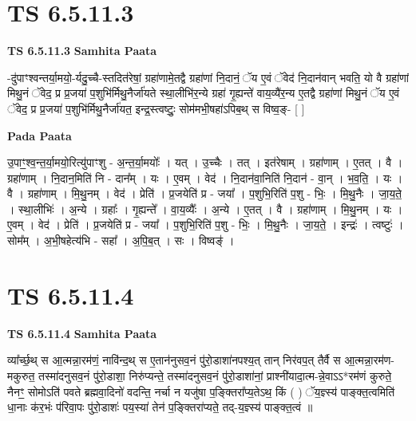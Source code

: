 \documentclass[17pt]{extarticle}
\begin{document}
\section*{ TS 6.5.11.3 }

\textbf{TS 6.5.11.3 } \newline
\textbf{Samhita Paata} \newline

-दु॑पाꣳश्वन्तर्या॒मयो॒-र्यदु॒च्चै-स्तदित॑रेषां॒ ग्रहा॑णामे॒तद्वै ग्रहा॑णां नि॒दानं॒ ॅय ए॒वं ॅवेद॑ नि॒दान॑वान् भवति॒ यो वै ग्रहा॑णां मिथु॒नं ॅवेद॒ प्र प्र॒जया॑ प॒शुभि॑र्मिथु॒नैर्जा॑यते स्था॒लीभि॑र॒न्ये ग्रहा॑ गृ॒ह्यन्ते॑ वाय॒व्यै॑र॒न्य ए॒तद्वै ग्रहा॑णां मिथु॒नं ॅय ए॒वं ॅवेद॒ प्र प्र॒जया॑ प॒शुभि॑र्मिथु॒नैर्जा॑यत॒ इन्द्र॒स्त्वष्टुः॒ सोम॑मभी॒षहा॑ऽपिब॒थ् स विष्व॒ङ्- [  ] \newline

\textbf{Pada Paata} \newline

उ॒पाꣳ॒॒श्व॒न्त॒र्या॒मयो॒रित्यु॑पाꣳशु - अ॒न्त॒र्या॒मयोः᳚ । यत् । उ॒च्चैः । तत् । इत॑रेषाम् । ग्रहा॑णाम् । ए॒तत् । वै । ग्रहा॑णाम् । नि॒दान॒मिति॑ नि - दान᳚म् । यः । ए॒वम् । वेद॑ । नि॒दान॑वा॒निति॑ नि॒दान॑ - वा॒न् । भ॒व॒ति॒ । यः । वै । ग्रहा॑णाम् । मि॒थु॒नम् । वेद॑ । प्रेति॑ । प्र॒जयेति॑ प्र - जया᳚ । प॒शुभि॒रिति॑ प॒शु - भिः॒ । मि॒थु॒नैः । जा॒य॒ते॒ । स्था॒लीभिः॑ । अ॒न्ये । ग्रहाः᳚ । गृ॒ह्यन्ते᳚ । वा॒य॒व्यैः᳚ । अ॒न्ये । ए॒तत् । वै । ग्रहा॑णाम् । मि॒थु॒नम् । यः । ए॒वम् । वेद॑ । प्रेति॑ । प्र॒जयेति॑ प्र - जया᳚ । प॒शुभि॒रिति॑ प॒शु - भिः॒ । मि॒थु॒नैः । जा॒य॒ते॒ । इन्द्रः॑ । त्वष्टुः॑ । सोम᳚म् । अ॒भी॒षहेत्य॑भि - सहा᳚ । अ॒पि॒ब॒त् । सः । विष्वङ्॑ ।  \newline




\section*{ TS 6.5.11.4 }

\textbf{TS 6.5.11.4 } \newline
\textbf{Samhita Paata} \newline

व्या᳚र्च्छ॒थ् स आ॒त्मन्ना॒रम॑णं॒ नावि॑न्द॒थ् स ए॒तान॑नुसव॒नं पु॑रो॒डाशा॑नपश्य॒त् तान् निर॑वप॒त् तैर्वै स आ॒त्मन्ना॒रम॑ण-मकुरुत॒ तस्मा॑दनुसव॒नं पु॑रो॒डाशा॒ निरु॑प्यन्ते॒ तस्मा॑दनुसव॒नं पु॑रो॒डाशा॑नां॒ प्राश्नी॑यादा॒त्म-न्ने॒वाऽऽ*रम॑णं कुरुते॒ नैनꣳ॒॒ सोमोऽति॑ पवते ब्रह्मवा॒दिनो॑ वदन्ति॒ नर्चा न यजु॑षा प॒ङ्क्तिरा᳚प्य॒तेऽथ॒ किं ( ) ॅय॒ज्ञ्स्य॑ पाङ्क्त॒त्वमिति॑ धा॒नाः क॑र॒भंः प॑रिवा॒पः पु॑रो॒डाशः॑ पय॒स्या॑ तेन॑ प॒ङ्क्तिरा॑प्यते॒ तद्-य॒ज्ञ्स्य॑ पाङ्क्त॒त्वं ॥ \newline
\end{document}
